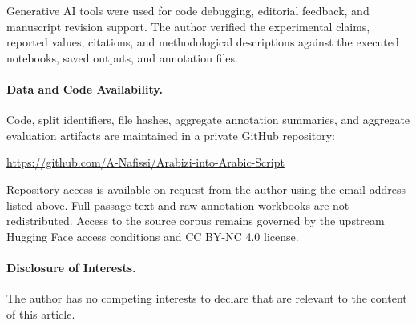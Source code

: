 \documentclass[runningheads]{llncs}
\begin{document}
Generative AI tools were used for code debugging, editorial feedback, and manuscript revision support. The author verified the experimental claims, reported values, citations, and methodological descriptions against the executed notebooks, saved outputs, and annotation files.

\noindent\begin{minipage}{\linewidth}
\paragraph{Data and Code Availability.} Code, split identifiers, file hashes, aggregate annotation summaries, and aggregate evaluation artifacts are maintained in a private GitHub repository:\par\noindent
\url{https://github.com/A-Nafissi/Arabizi-into-Arabic-Script}\par\noindent
Repository access is available on request from the author using the email address listed above. Full passage text and raw annotation workbooks are not redistributed. Access to the source corpus remains governed by the upstream Hugging Face access conditions and CC BY-NC 4.0 license.
\end{minipage}

\paragraph{Disclosure of Interests.} The author has no competing interests to declare that are relevant to the content of this article.



\end{document}

